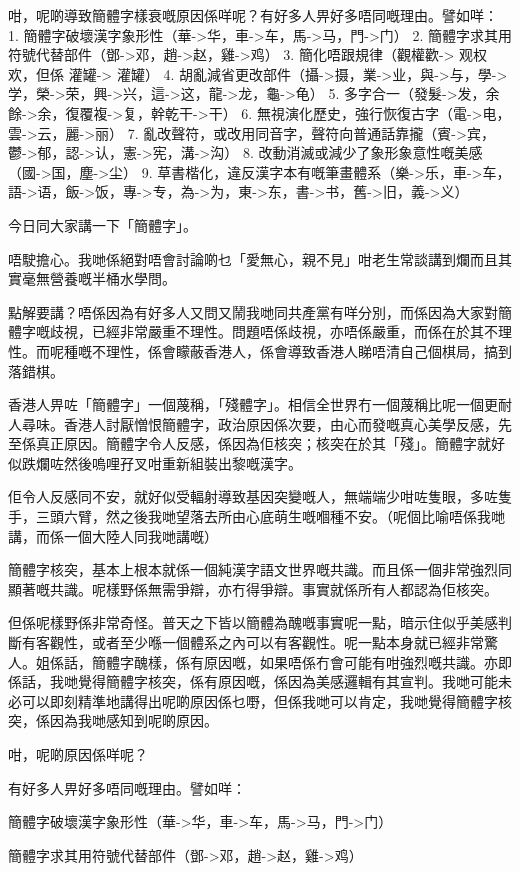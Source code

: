 \documentclass[a5paper, 10pt, openany]{book} %
\begin{document}
咁，呢啲導致簡體字樣衰嘅原因係咩呢？有好多人畀好多唔同嘅理由。譬如咩：
1. 簡體字破壞漢字象形性（華->华，車->车，馬->马，門->门）
2. 簡體字求其用符號代替部件（鄧->邓，趙->赵，雞->鸡）
3. 簡化唔跟規律（觀權歡-> 观权欢，但係 灌罐-> 灌罐）
4. 胡亂減省更改部件（攝->摄，業->业，與->与，學->学，榮->荣，興->兴，這->这，龍->龙，龜->龟）
5. 多字合一（發髮->发，余餘->余，復覆複->复，幹乾干->干）
6. 無視演化歷史，強行恢復古字（電->电，雲->云，麗->丽）
7. 亂改聲符，或改用同音字，聲符向普通話靠攏（賓->宾，鬱->郁，認->认，憲->宪，溝->沟）
8. 改動消滅或減少了象形象意性嘅美感（國->国，塵->尘）
9. 草書楷化，違反漢字本有嘅筆畫體系（樂->乐，車->车，語->语，飯->饭，專->专，為->为，東->东，書->书，舊->旧，義->义）


今日同大家講一下「簡體字」。

唔駛擔心。我哋係絕對唔會討論啲乜「愛無心，親不見」咁老生常談講到爛而且其實毫無營養嘅半桶水學問。

點解要講？唔係因為有好多人又問又鬧我哋同共產黨有咩分別，而係因為大家對簡體字嘅歧視，已經非常嚴重不理性。問題唔係歧視，亦唔係嚴重，而係在於其不理性。而呢種嘅不理性，係會矇蔽香港人，係會導致香港人睇唔清自己個棋局，搞到落錯棋。

香港人畀咗「簡體字」一個蔑稱，「殘體字」。相信全世界冇一個蔑稱比呢一個更耐人尋味。香港人討厭憎恨簡體字，政治原因係次要，由心而發嘅真心美學反感，先至係真正原因。簡體字令人反感，係因為佢核突；核突在於其「殘」。簡體字就好似跌爛咗然後嗚哩孖叉咁重新組裝出黎嘅漢字。

佢令人反感同不安，就好似受輻射導致基因突變嘅人，無端端少咁咗隻眼，多咗隻手，三頭六臂，然之後我哋望落去所由心底萌生嘅嗰種不安。（呢個比喻唔係我哋講，而係一個大陸人同我哋講嘅）

簡體字核突，基本上根本就係一個純漢字語文世界嘅共識。而且係一個非常強烈同顯著嘅共識。呢樣野係無需爭辯，亦冇得爭辯。事實就係所有人都認為佢核突。

但係呢樣野係非常奇怪。普天之下皆以簡體為醜嘅事實呢一點，暗示住似乎美感判斷有客觀性，或者至少喺一個體系之內可以有客觀性。呢一點本身就已經非常驚人。姐係話，簡體字醜樣，係有原因嘅，如果唔係冇會可能有咁強烈嘅共識。亦即係話，我哋覺得簡體字核突，係有原因嘅，係因為美感邏輯有其宣判。我哋可能未必可以即刻精準地講得出呢啲原因係乜嘢，但係我哋可以肯定，我哋覺得簡體字核突，係因為我哋感知到呢啲原因。

咁，呢啲原因係咩呢？

有好多人畀好多唔同嘅理由。譬如咩：

簡體字破壞漢字象形性（華->华，車->车，馬->马，門->门）

簡體字求其用符號代替部件（鄧->邓，趙->赵，雞->鸡）
\end{document}

